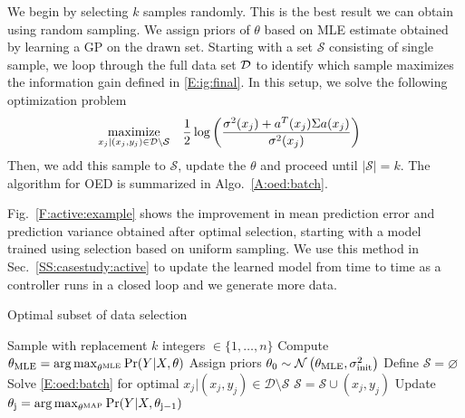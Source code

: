 We begin by selecting \(k\) samples randomly. This is the best result we can obtain using random sampling. We assign priors of \(\theta\) based on MLE estimate obtained by learning a GP on the drawn set.
Starting with a set \(\mathcal{S}\) consisting of single sample, we loop through the full data set \(\mathcal{D}\) to identify which sample maximizes the information gain defined in \eqref{E:ig:final}. In this setup, we solve the following optimization problem
\begin{align}
\label{E:oed:batch}
\maximize_{x_{j}|(x_j,y_j) \in \mathcal{D} \setminus \mathcal{S}} & \ \ \ \frac{1}{2}\log\left(\frac{\sigma^2(x_j)+a^T(x_j)\Sigma a(x_j)}{\sigma^2(x_j)}\right)
\end{align}
Then, we add this sample to \(\mathcal{S}\), update the \(\theta\)  and proceed until \(|\mathcal{S}|=k\).
The algorithm for OED is summarized in Algo.~\ref{A:oed:batch}. 

Fig.~\ref{F:active:example} shows the improvement in mean prediction error and prediction variance obtained after optimal selection, starting with a model trained using selection based on uniform sampling. We use this method in Sec.~\ref{SS:casestudy:active} to update the learned model from time to time as a controller runs in a closed loop and we generate more data.

\begin{algorithm}[!tb]
	\caption{Optimal subset of data selection}
	\label{A:oed:batch}
	\begin{algorithmic}[1]
		\State Sample with replacement \(k\) integers \( \in \{1,\dots,n\} \)
		\State Compute \( \theta_{\mathrm{MLE}} = \operatorname*{arg\,max}_{\theta^{\mathrm{MLE}}} \Pr(Y \vert X, \theta)\)
		\State Assign priors \(\theta_{\mathrm{0}} \sim \operatorname*{\mathcal{N}}\left(\theta_{\mathrm{MLE}}, \sigma^2_{\mathrm{init}}\right)\)
		\EndProcedure
		\State Define \(\mathcal{S} = \varnothing\)
		\State Solve \eqref{E:oed:batch} for optimal \({x_{j} \vert (x_j,y_j) \in \mathcal{D} \setminus \mathcal{S}} \)
		\State \(\mathcal{S} = \mathcal{S} \cup (x_j,y_j) \)
		\State Update \( \theta_{\mathrm{j}} = \operatorname*{arg\,max}_{\theta^{\mathrm{MAP}}} \Pr(Y \vert X, \theta_{\mathrm{j-1}})\)
		\EndWhile
		\EndProcedure
	\end{algorithmic}
\end{algorithm}

%	
